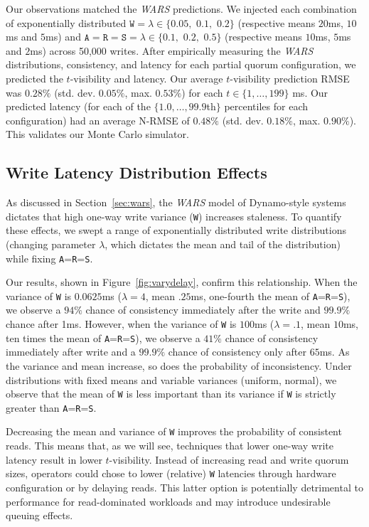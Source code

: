 \documentclass{vldb}
\newcommand{\subsectionskip}{-0em}
\begin{document}
Our observations matched the \textit{WARS} predictions. We injected
each combination of exponentially distributed $\texttt{W}=\lambda \in
\{0.05,$ $0.1,$ $0.2\}$ (respective means $20$ms, $10$ms and $5$ms)
and $\texttt{A}$$=$$\texttt{R}$$=$$\texttt{S}=\lambda \in \{0.1,$
$0.2,$ $0.5\}$ (respective means $10$ms, $5$ms and $2$ms) across
50,000 writes.  After empirically measuring the \textit{WARS}
distributions, consistency, and latency for each partial quorum
configuration, we predicted the $t$-visibility and latency. Our
average $t$-visibility prediction RMSE was $0.28\%$
(std. dev. $0.05\%$, max. $0.53\%$) for each
$t\in$$\{1,$$\dots,$$199\}$ ms. Our predicted latency (for each of the
$\{1.0, \dots, 99.9$th$\}$ percentiles for each configuration) had an
average N-RMSE of $0.48\%$ (std. dev. $0.18\%$, max. $0.90\%$).  This
validates our Monte Carlo simulator.


\vspace{\subsectionskip}\subsection{Write Latency Distribution Effects}
\label{sec:synthetic}

As discussed in Section~\ref{sec:wars}, the \textit{WARS} model of
Dynamo-style systems dictates that high one-way write variance
(\texttt{W}) increases staleness.  To quantify these effects, we swept
a range of exponentially distributed write distributions (changing
parameter $\lambda$, which dictates the mean and tail of the
distribution) while fixing \texttt{A}=\texttt{R}=\texttt{S}.

Our results, shown in Figure~\ref{fig:varydelay}, confirm this
relationship.  When the variance of \texttt{W} is $0.0625$ms
($\lambda=4$, mean $.25$ms, one-fourth the mean of
\texttt{A}=\texttt{R}=\texttt{S}), we observe a $94\%$ chance of
consistency immediately after the write and $99.9\%$ chance after 1ms.
However, when the variance of \texttt{W} is $100$ms ($\lambda=.1$,
mean $10$ms, ten times the mean of \texttt{A}=\texttt{R}=\texttt{S}),
we observe a $41\%$ chance of consistency immediately after write and
a $99.9\%$ chance of consistency only after $65$ms.  As the variance
and mean increase, so does the probability of inconsistency.  Under
distributions with fixed means and variable variances (uniform,
normal), we observe that the mean of \texttt{W} is less important than
its variance if \texttt{W} is strictly greater than
\texttt{A}=\texttt{R}=\texttt{S}.

Decreasing the mean and variance of \texttt{W} improves the
probability of consistent reads.  This means that, as we will see,
techniques that lower one-way write latency result in lower
$t$-visibility.  Instead of increasing read and write quorum sizes,
operators could chose to lower (relative) \texttt{W} latencies through
hardware configuration or by delaying reads.  This latter option is
potentially detrimental to performance for read-dominated workloads and
may introduce undesirable queuing effects.
\end{document}
